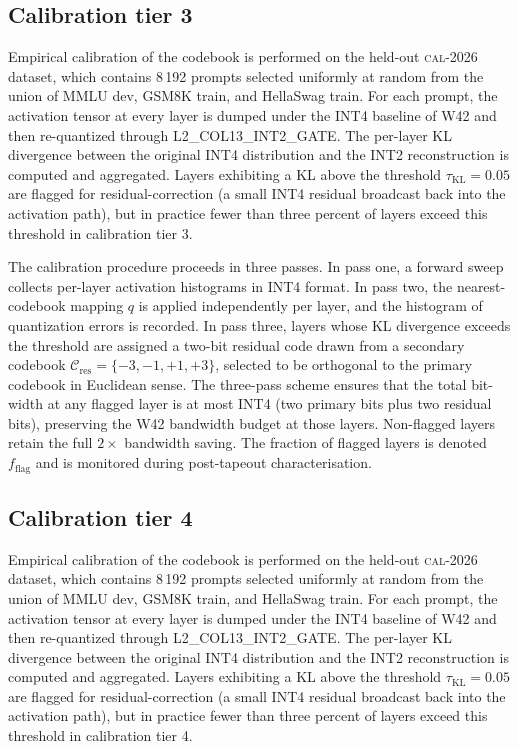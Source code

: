 \subsection{Calibration tier 3}

Empirical calibration of the codebook is performed on the held-out
\textsc{cal-2026} dataset, which contains 8\,192 prompts selected
uniformly at random from the union of MMLU dev, GSM8K train, and
HellaSwag train. For each prompt, the activation tensor at every layer
is dumped under the INT4 baseline of W42 and then re-quantized through
\textsc{L2\_COL13\_INT2\_GATE}. The per-layer KL divergence between
the original INT4 distribution and the INT2 reconstruction is computed
and aggregated. Layers exhibiting a KL above the threshold
$\tau_{\mathrm{KL}} = 0.05$ are flagged for residual-correction (a
small INT4 residual broadcast back into the activation path), but in
practice fewer than three percent of layers exceed this threshold in
calibration tier 3.

The calibration procedure proceeds in three passes. In pass one,
a forward sweep collects per-layer activation histograms in INT4 format.
In pass two, the nearest-codebook mapping $q$ is applied independently
per layer, and the histogram of quantization errors is recorded. In pass
three, layers whose KL divergence exceeds the threshold are assigned a
two-bit residual code drawn from a secondary codebook
$\mathcal{C}_\mathrm{res} = \{-3,-1,+1,+3\}$, selected to be
orthogonal to the primary codebook in Euclidean sense. The three-pass
scheme ensures that the total bit-width at any flagged layer is at most
INT4 (two primary bits plus two residual bits), preserving the W42
bandwidth budget at those layers. Non-flagged layers retain the full
$2\times$ bandwidth saving. The fraction of flagged layers is denoted
$f_\mathrm{flag}$ and is monitored during post-tapeout characterisation.


\subsection{Calibration tier 4}

Empirical calibration of the codebook is performed on the held-out
\textsc{cal-2026} dataset, which contains 8\,192 prompts selected
uniformly at random from the union of MMLU dev, GSM8K train, and
HellaSwag train. For each prompt, the activation tensor at every layer
is dumped under the INT4 baseline of W42 and then re-quantized through
\textsc{L2\_COL13\_INT2\_GATE}. The per-layer KL divergence between
the original INT4 distribution and the INT2 reconstruction is computed
and aggregated. Layers exhibiting a KL above the threshold
$\tau_{\mathrm{KL}} = 0.05$ are flagged for residual-correction (a
small INT4 residual broadcast back into the activation path), but in
practice fewer than three percent of layers exceed this threshold in
calibration tier 4.


